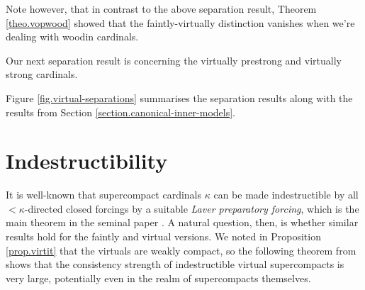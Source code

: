 \documentclass[../../main]{subfiles}
\begin{document}
Note however, that in contrast to the above separation result, Theorem \ref{theo.vopwood} showed that the faintly-virtually distinction vanishes when we're dealing with woodin cardinals.

\qquad Our next separation result is concerning the virtually prestrong and virtually strong cardinals.



\qquad Figure \ref{fig.virtual-separations} summarises the separation results along with the results from Section \ref{section.canonical-inner-models}.



\section{Indestructibility}

It is well-known that supercompact cardinals $\kappa$ can be made indestructible by all ${<}\kappa$-directed closed forcings by a suitable \textit{Laver preparatory forcing}, which is the main theorem in the seminal paper \cite{laver-indestructibility}. A natural question, then, is whether similar results hold for the faintly and virtual versions. We noted in Proposition \ref{prop.virtit} that the virtuals are weakly compact, so the following theorem from \cite{mousestack} shows that the consistency strength of indestructible virtual supercompacts is very large, potentially even in the realm of supercompacts themselves.
\end{document}
